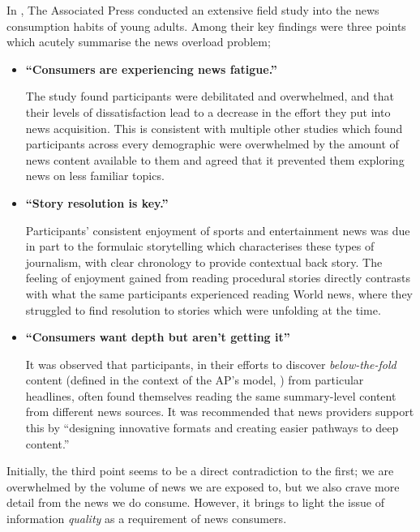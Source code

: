 In \citeyear{anewmodelfornews}, The Associated Press conducted an extensive field study  into the news consumption habits of young adults. Among their key findings were three points which acutely summarise the news overload problem;
\begin{itemize}
	\item \textbf{``Consumers are experiencing news fatigue.''} \par
	The study found participants were debilitated and overwhelmed, and that their levels of dissatisfaction lead to a decrease in the effort they put into news acquisition. This is consistent with multiple other studies \citep{newsandtheoverloadedcustomer, UnderstandingTheParticipatoryNewsConsumer, InformationAccessinComplexPoorlyStructuredInformationSpaces} which found participants across every demographic were overwhelmed by the amount of news content available to them and agreed that it prevented them exploring news on less familiar topics.\\ 
	
	\item \textbf{``Story resolution is key.''} \par
	Participants' consistent enjoyment of sports and entertainment news was due in part to the formulaic storytelling which characterises these types of journalism, with clear chronology to provide contextual back story. The feeling of enjoyment gained from reading procedural stories directly contrasts with what the same participants experienced reading World news, where they struggled to find resolution to stories which were unfolding at the time.
	
	\item \textbf{``Consumers want depth but aren't getting it''} \par
	It was observed that participants, in their efforts to discover \textit{below-the-fold} content (defined in the context of the AP's model, \citeyear[p.37]{anewmodelfornews}) from particular headlines, often found themselves reading the same summary-level content from different news sources. It was recommended that news providers support this by ``designing innovative formats and creating easier pathways to deep content.'' \citep[p.49]{anewmodelfornews}
\end{itemize}

Initially, the third point seems to be a direct contradiction to the first; we are overwhelmed by the volume of news we are exposed to, but we also crave more detail from the news we do consume. However, it brings to light the issue of information \textit{quality} as a requirement of news consumers.

